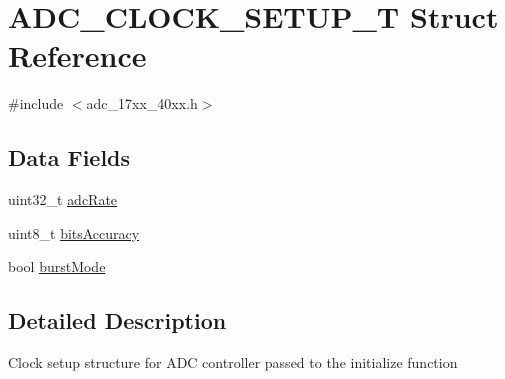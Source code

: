 \hypertarget{structADC__CLOCK__SETUP__T}{\section{A\-D\-C\-\_\-\-C\-L\-O\-C\-K\-\_\-\-S\-E\-T\-U\-P\-\_\-\-T Struct Reference}
\label{structADC__CLOCK__SETUP__T}
}


{\ttfamily \#include $<$adc\-\_\-17xx\-\_\-40xx.\-h$>$}

\subsection*{Data Fields}
\begin{DoxyCompactItemize}
\item 
uint32\-\_\-t \hyperlink{structADC__CLOCK__SETUP__T_a8948fd266d15eee3d090cab24a64ff42}{adc\-Rate}
\item 
uint8\-\_\-t \hyperlink{structADC__CLOCK__SETUP__T_aeb37891571691033d98087dabf6ddbd5}{bits\-Accuracy}
\item 
bool \hyperlink{structADC__CLOCK__SETUP__T_a92bc50d4472a36de38dac15a5fd3109a}{burst\-Mode}
\end{DoxyCompactItemize}


\subsection{Detailed Description}
Clock setup structure for A\-D\-C controller passed to the initialize function 

